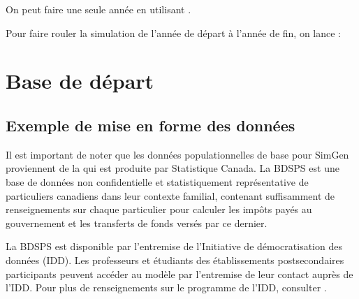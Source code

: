 \documentclass[letterpaper,10pt,french]{sphinxmanual}
\begin{document}
On peut faire une seule année en utilisant .

\begin{sphinxVerbatim}[commandchars=\\\{\}]
\end{sphinxVerbatim}

Pour faire rouler la simulation de l’année de départ à l’année de fin, on lance :

\begin{sphinxVerbatim}[commandchars=\\\{\}]
 
\end{sphinxVerbatim}

\begin{sphinxVerbatim}[commandchars=\\\{\}]
\end{sphinxVerbatim}


\chapter{Base de départ}
\label{\detokenize{import:base-de-depart}}\label{\detokenize{import:import}}\label{\detokenize{import::doc}}

\section{Exemple de mise en forme des données}
\label{\detokenize{import:exemple-de-mise-en-forme-des-donnees}}
Il est important de noter que les données populationnelles de base pour SimGen proviennent de la  qui est produite par Statistique Canada. La BDSPS est une base de données non confidentielle et statistiquement représentative de particuliers canadiens dans leur contexte familial, contenant suffisamment de renseignements sur chaque particulier pour calculer
les impôts payés au gouvernement et les transferts de fonds versés par ce dernier.

La BDSPS est disponible par l’entremise de l’Initiative de démocratisation des données (IDD). Les professeurs et étudiants des établissements postsecondaires participants peuvent accéder au modèle par l’entremise de leur contact auprès de l’IDD. Pour plus de renseignements sur le programme de l’IDD, consulter .
\end{document}
